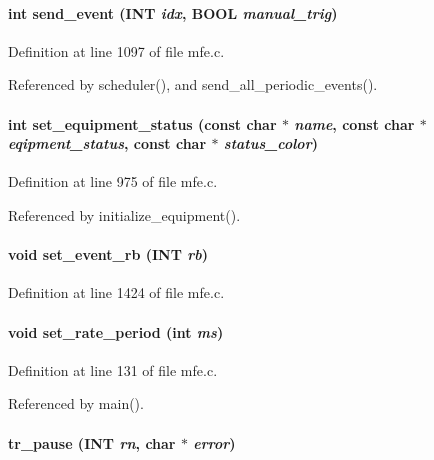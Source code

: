 \paragraph[{send\_\-event}]{\setlength{\rightskip}{0pt plus 5cm}int send\_\-event ({\bf INT} {\em idx}, \/  {\bf BOOL} {\em manual\_\-trig})}\hfill\label{mfe_8c_a467e7d6c77bcbb9259a7167ae1cdf29a}


Definition at line 1097 of file mfe.c.

Referenced by scheduler(), and send\_\-all\_\-periodic\_\-events().
\paragraph[{set\_\-equipment\_\-status}]{\setlength{\rightskip}{0pt plus 5cm}int set\_\-equipment\_\-status (const char $\ast$ {\em name}, \/  const char $\ast$ {\em eqipment\_\-status}, \/  const char $\ast$ {\em status\_\-color})}\hfill\label{mfe_8c_a3ab359e237ee86bc2f53285b7bf2f673}


Definition at line 975 of file mfe.c.

Referenced by initialize\_\-equipment().
\paragraph[{set\_\-event\_\-rb}]{\setlength{\rightskip}{0pt plus 5cm}void set\_\-event\_\-rb ({\bf INT} {\em rb})}\hfill\label{mfe_8c_aab90250febb716e08aff848e5382b496}


Definition at line 1424 of file mfe.c.
\paragraph[{set\_\-rate\_\-period}]{\setlength{\rightskip}{0pt plus 5cm}void set\_\-rate\_\-period (int {\em ms})}\hfill\label{mfe_8c_a0a854b7675d4589bce8f016a94b2706c}


Definition at line 131 of file mfe.c.

Referenced by main().
\paragraph[{tr\_\-pause}]{ tr\_\-pause ({\bf INT} {\em rn}, \/  char $\ast$ {\em error})}\hfill\label{mfe_8c_a7b3b6a2f570d0b31b1ad13c34536db5a}


